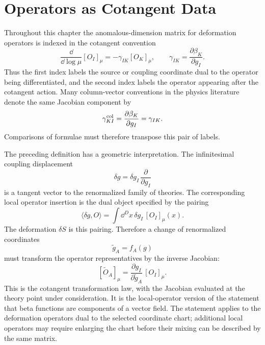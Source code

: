 \section{Operators as Cotangent Data}

\begin{warning}
Throughout this chapter the anomalous-dimension matrix for deformation
operators is indexed in the cotangent convention
\[
  \frac{\dd}{\dd\log\mu}[O_I]_\mu
  =
  -\gamma_{IK}[O_K]_\mu,
  \qquad
  \gamma_{IK}
  =
  \frac{\partial\beta_K}{\partial g_I}.
\]
Thus the first index labels the source or coupling coordinate dual to the
operator being differentiated, and the second index labels the operator
appearing after the cotangent action.  Many column-vector conventions in the
physics literature denote the same Jacobian component by
\[
  \gamma^{\rm col}_{KI}
  =
  \frac{\partial\beta_K}{\partial g_I}
  =
  \gamma_{IK}.
\]
Comparisons of formulae must therefore transpose this pair of labels.
\end{warning}

The preceding definition has a geometric interpretation.  The infinitesimal
coupling displacement
\[
  \delta g=\delta g_I\,\frac{\partial}{\partial g_I}
\]
is a tangent vector to the renormalized family of theories.  The corresponding
local operator insertion is the dual object specified by the pairing
\[
  \langle \delta g,O\rangle
  =
  \int \dd^D x\,\delta g_I\, [O_I]_\mu(x).
\]
The deformation \(\delta S\) is this pairing.  Therefore a change of
renormalized coordinates
\[
  \widetilde g_A=f_A(g)
\]
must transform the operator representatives by the inverse Jacobian:
\[
  [\widetilde O_A]_\mu
  =
  \frac{\partial g_I}{\partial \widetilde g_A}\,
  [O_I]_\mu .
\]
This is the cotangent transformation law, with the Jacobian evaluated at the
theory point under consideration.  It is the local-operator version of the
statement that beta functions are components of a vector field.  The statement
applies to the deformation operators dual to the selected coordinate chart;
additional local operators may require enlarging the chart before their mixing
can be described by the same matrix.

